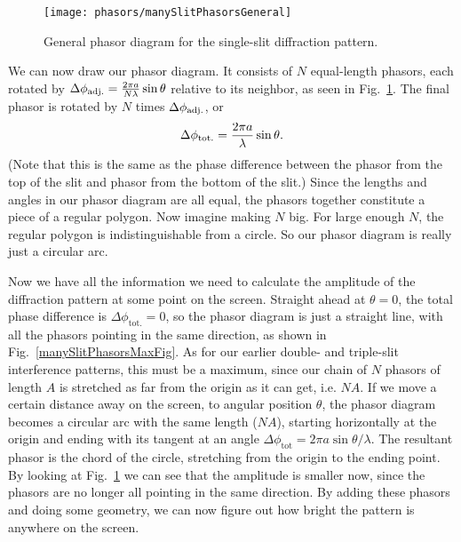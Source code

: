 \begin{figure}[t]
\begin{center}\texttt{[image: phasors/manySlitPhasorsGeneral]}
\end{center}
\caption{\label{manySlitPhasorsGenFig}General phasor diagram for the
single-slit diffraction pattern.}
\end{figure}


We can now draw our phasor diagram. It consists of $N$ equal-length
phasors, each rotated by $\Delta\phi_{\rm adj.} = \frac{2\pi
a}{N\lambda}\sin\theta$ relative to its neighbor, as seen in 
Fig.~\ref{manySlitPhasorsGenFig}.  The final phasor is rotated
by $N$ times $\Delta\phi_{\rm adj.}$, or
\begin{equation}
\Delta\phi_{\rm tot.}=\frac{2\pi a}{\lambda}\sin\theta.
\end{equation}
(Note that this is
the same as the phase difference between the phasor from the top of
the slit and phasor from the bottom of the slit.)  Since the lengths
and angles in our phasor diagram are all equal, the phasors together
constitute a piece of a regular polygon.  Now imagine making $N$ big.
For large enough $N$, the regular polygon is indistinguishable from a
circle. So our phasor diagram is really just a circular arc.

Now we have all the information we need to calculate the amplitude of
the diffraction pattern at some point on the screen. Straight ahead at
$\theta=0$, the total phase difference is $\Delta\phi_\text{tot.}= 0$,
so the phasor diagram is just a straight line, with all the phasors
pointing in the same direction, as shown in 
Fig.~\ref{manySlitPhasorsMaxFig}.  As for our earlier double- and
triple-slit interference patterns, this must be a maximum, since our
chain of $N$ phasors of length $A$ is stretched as far from the origin
as it can get, i.e. $NA$.  If we move a certain distance away on the
screen, to angular position $\theta$, the phasor diagram becomes a
circular arc with the same length ($NA$), starting horizontally at the
origin and ending with its tangent at an angle $\Delta \phi_\text{tot}
= 2\pi a\sin\theta/\lambda$.  The resultant phasor is the chord of the
circle, stretching from the origin to the ending point. By looking
at Fig.~\ref{manySlitPhasorsGenFig} we can see that the
amplitude is smaller now, since the phasors are no longer all pointing in the
same direction.  By adding these phasors and doing some geometry, we can
now figure out how bright the pattern is anywhere on the screen.



